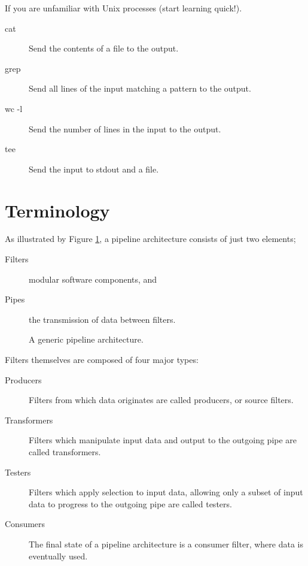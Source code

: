 \noindent
If you are unfamiliar with Unix processes (start learning quick!).
\begin{description}
    \item[cat] Send the contents of a file to the output.
    \item[grep] Send all lines of the input matching a pattern to the output.
    \item[wc -l] Send the number of lines in the input to the output.
    \item[tee] Send the input to stdout and a file.
\end{description}

\section{Terminology}

As illustrated by Figure \ref{fig:pipe-filter}, a pipeline architecture consists of just two elements;

\begin{description}
    \item[Filters] modular software components, and
    \item[Pipes] the transmission of data between filters.   
\end{description}

\begin{figure}[ht]
    \centering
{}
\caption{A generic pipeline architecture.}
\label{fig:pipe-filter}
\end{figure}

\noindent Filters themselves are composed of four major types:

\begin{description}
    \item[Producers] Filters from which data originates are called producers, or source filters.
    \item[Transformers] Filters which manipulate input data and output to the outgoing pipe are called transformers.
    \item[Testers] Filters which apply selection to input data, allowing only a subset of input data to progress to the outgoing pipe are called testers.
    \item[Consumers] The final state of a pipeline architecture is a consumer filter, where data is eventually used.
\end{description}

